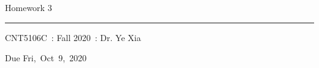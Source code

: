 \documentclass[fleqn]{article}
\newcommand{\myCourse}{CNT5106C}
\newcommand{\mySection}{Fall 2020}
\newcommand{\myTeacher}{Dr. Ye Xia}
\newcommand{\myAssignment}{Homework 3}
\newcommand{\myDueDate}{Fri,\ Oct\ 9,\ 2020}
\begin{document}
\title{\vspace{-1in}} %
\author{} %
\date{} %
\maketitle %

\usebox{\myTitleSignature}
\vspace{1in} %

{\centering \huge \myAssignment \par}
{\centering \noindent\rule{4in}{0.1pt} \par}
\vspace{0.05in}
{\centering \myCourse~: \mySection~: \myTeacher \par}
{\centering Due \myDueDate \par}
\vspace{1in}

\tableofcontents
\newpage

\end{document}

